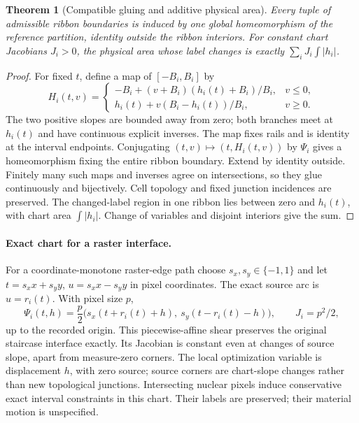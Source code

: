 \documentclass[10pt,letterpaper]{article}
\newtheorem{theorem}{Theorem}
\begin{document}
\begin{samepage}
\begin{theorem}[Compatible gluing and additive physical area]\label{thm:glue}
Every tuple of admissible ribbon boundaries is induced by one global homeomorphism of the reference partition, identity outside the ribbon interiors. For constant chart Jacobians $J_i>0$, the physical area whose label changes is exactly $\sum_i J_i\int|h_i|$.
\end{theorem}
\end{samepage}
\begin{proof}
For fixed $t$, define a map of $[-B_i,B_i]$ by
\begin{equation}
H_i(t,v)=\begin{cases}
-B_i+(v+B_i)(h_i(t)+B_i)/B_i,&v\le0,\\
h_i(t)+v(B_i-h_i(t))/B_i,&v\ge0.
\end{cases}\label{eq:homeo}
\end{equation}
The two positive slopes are bounded away from zero; both branches meet at $h_i(t)$ and have continuous explicit inverses. The map fixes rails and is identity at the interval endpoints. Conjugating $(t,v)\mapsto(t,H_i(t,v))$ by $\Psi_i$ gives a homeomorphism fixing the entire ribbon boundary. Extend by identity outside. Finitely many such maps and inverses agree on intersections, so they glue continuously and bijectively. Cell topology and fixed junction incidences are preserved. The changed-label region in one ribbon lies between zero and $h_i(t)$, with chart area $\int|h_i|$. Change of variables and disjoint interiors give the sum.
\end{proof}

\paragraph{Exact chart for a raster interface.}
For a coordinate-monotone raster-edge path choose $s_x,s_y\in\{-1,1\}$ and let $t=s_xx+s_yy$, $u=s_xx-s_yy$ in pixel coordinates. The exact source arc is $u=r_i(t)$. With pixel size $p$,
\begin{equation}
\Psi_i(t,h)=\frac p2\big(s_x(t+r_i(t)+h),\ s_y(t-r_i(t)-h)\big),\qquad J_i=p^2/2,\label{eq:chart}
\end{equation}
up to the recorded origin. This piecewise-affine shear preserves the original staircase interface exactly. Its Jacobian is constant even at changes of source slope, apart from measure-zero corners. The local optimization variable is displacement $h$, with zero source; source corners are chart-slope changes rather than new topological junctions. Intersecting nuclear pixels induce conservative exact interval constraints in this chart. Their labels are preserved; their material motion is unspecified.
\end{document}
